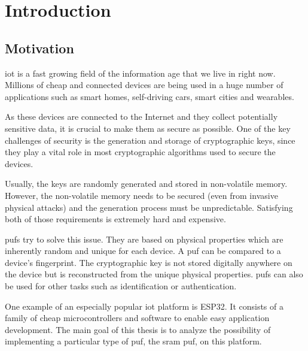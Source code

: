 \chapter*{Introduction}\label{sec:introduction}
{}

\section*{Motivation}
{}

\Gls{iot} is a fast growing field of the information age that we live in right now. Millions of cheap and connected devices are being used in a huge number of applications such as smart homes, self-driving cars, smart cities and wearables.

As these devices are connected to the Internet and they collect potentially sensitive data, it is crucial to make them as secure as possible. One of the key challenges of security is the generation and storage of cryptographic keys, since they play a vital role in most cryptographic algorithms used to secure the devices.

Usually, the keys are randomly generated and stored in non-volatile memory. However, the non-volatile memory needs to be secured (even from invasive physical attacks) and the generation process must be unpredictable. Satisfying both of those requirements is extremely hard and expensive.

\Glspl{puf} try to solve this issue. They are based on physical properties which are inherently random and unique for each device. A \gls{puf} can be compared to a device's fingerprint. The cryptographic key is not stored digitally anywhere on the device but is reconstructed from the unique physical properties. \Glspl{puf} can also be used for other tasks such as identification or authentication.

One example of an especially popular \gls{iot} platform is ESP32. It consists of a family of cheap microcontrollers and software to enable easy application development. The main goal of this thesis is to analyze the possibility of implementing a particular type of \gls{puf}, the \gls{sram} \gls{puf}, on this platform.

